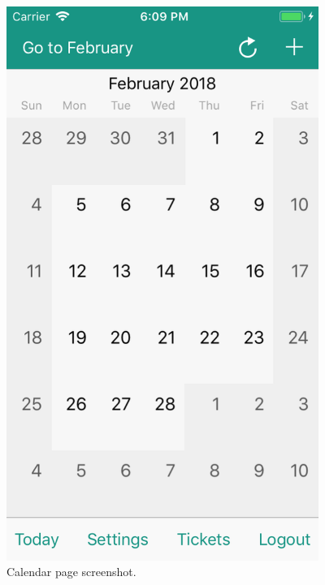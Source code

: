\begin{figure}
	\centering
	\includegraphics[width=4in]{./screenshots/iOScalendar.png}
	\caption{Calendar page screenshot.}
	\label{fig:ioscalendar}
\end{figure}


